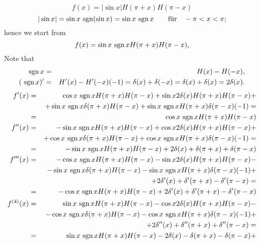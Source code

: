 {\begin{enumerate}
$$
   f(x)=|\sin x|H(\pi+x)H(\pi-x)
$$
$$
   |\sin x|=\sin x\mbox{ sgn}(\sin x)=\sin x\mbox{ sgn\,}x\qquad\mbox{f\"ur}
   \quad -\pi<x<\pi ;
$$
hence we start from
$$
  f(x)=\sin x\mbox{ sgn\,}xH(\pi+x)H(\pi-x),
$$
Note that
\begin{eqnarray*}
   \mbox{ sgn\,}x&=&H(x)-H(-x),\\
   (\mbox{ sgn\,}x)'&=&H'(x)-H'(-x)(-1)=\delta(x)+\delta(-x)=
                   \delta(x)+\delta(x)=2\delta(x).
\end{eqnarray*}
\begin{eqnarray*}
   f'(x)   &=   &\cos x\mbox{ sgn\,}xH(\pi+x)
           H(\pi-x)+\sin x2\delta(x)H(\pi+x)H(\pi-x)+\\
           &    &+\sin x\mbox{ sgn\,}x\delta(\pi+x)H(\pi-x) +
           \sin x\mbox{ sgn\,}x H(\pi+x)\delta(\pi-x)(-1)=\\
           &=   &\cos x\mbox{ sgn\,}xH(\pi+x)H(\pi-x)\\
   f''(x)   &=   & -\sin x\mbox{ sgn\,}xH(\pi+x)H(\pi-x)+
             \cos x2\delta(x)H(\pi+x)H(\pi-x)+\\
           &    &+\cos x\mbox{ sgn\,}x\delta(\pi + x)H(\pi - x)
              + \cos x\mbox{ sgn\,}x H(\pi + x)\delta(\pi - x)(-1)=\\
           &=   & -\sin x\mbox{ sgn\,}xH(\pi+x)H(\pi-x)+
             2\delta(x)+\delta(\pi+x)+\delta(\pi-x)\\
   f'''(x)   &=   & -\cos x\mbox{ sgn\,}xH(\pi+x)H(\pi-x)-
             \sin x2\delta(x)H(\pi+x)H(\pi-x)-\\
           &    &-\sin x\mbox{ sgn\,}x\delta(\pi+x)H(\pi-x) -
             \sin x \mbox{ sgn\,}x H(\pi+x)\delta(\pi-x)(-1)+\\
           &    &+2\delta'(x)+\delta'(\pi+x)-\delta'(\pi-x)=\\
           &=   & -\cos x\mbox{ sgn\,}xH(\pi+x)H(\pi-x)+
             2\delta'(x)+\delta'(\pi+x)-\delta'(\pi-x)\\
   f^{(4)}(x)   &=   & \sin x\mbox{ sgn\,}xH(\pi+x)H(\pi-x)-
             \cos x2\delta(x)H(\pi+x)H(\pi-x)-\\
           &    &-\cos x\mbox{ sgn\,}x\delta(\pi+x)H(\pi-x) -
             \cos x \mbox{ sgn\,}x H(\pi+x)\delta(\pi - x)(-1)+\\
           &    &+2\delta''(x)+\delta''(\pi+x)+\delta''(\pi-x)=\\
           &=   & \sin x\mbox{ sgn\,}xH(\pi+x)H(\pi-x)-
             2\delta(x)-\delta(\pi+x)-\delta(\pi-x)+\\

\end{eqnarray*}
\end{enumerate}}

